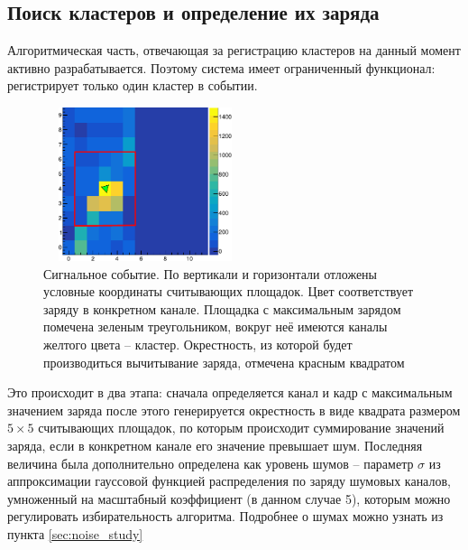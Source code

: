  \subsection{Поиск кластеров и определение их заряда}
 Алгоритмическая часть, отвечающая за регистрацию кластеров на данный момент активно разрабатывается. Поэтому система имеет ограниченный функционал: регистрирует только один кластер в событии. 
 \begin{figure}[h]
 	\begin{center}
 		\includegraphics[width = 6cm, height = 4.5cm]{img/cluster_padmap.pdf}
 		\caption{Сигнальное событие. По вертикали и горизонтали отложены условные координаты считывающих площадок. Цвет соответствует заряду в конкретном канале. Площадка с максимальным зарядом помечена зеленым треугольником, вокруг неё имеются каналы желтого цвета -- кластер. Окрестность, из которой будет производиться вычитывание заряда, отмечена красным квадратом}
 		\label{fig:cluster_padmap}
 	\end{center}
 \end{figure}
 Это происходит в два этапа: сначала определяется канал и кадр с максимальным значением заряда после этого генерируется окрестность в виде квадрата размером $5\times5$ считывающих площадок, по которым происходит суммирование значений заряда, если в конкретном канале его значение превышает шум. Последняя величина была дополнительно определена как уровень шумов -- параметр $\sigma$ из аппроксимации гауссовой функцией распределения по заряду шумовых каналов, умноженный на масштабный коэффициент (в данном случае 5), которым можно регулировать избирательность алгоритма. Подробнее о шумах можно узнать из пункта \ref{sec:noise_study}
 
 
 
